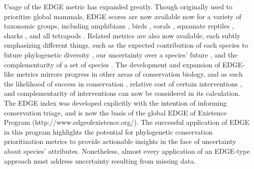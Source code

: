 \documentclass[10pt,english]{article}
\begin{document}
Usage of the EDGE metric has expanded greatly. Though originally used to
prioritize global mammals, EDGE scores are now available now for a variety of
taxonomic groups, including amphibians \autocite{Isaac2012}, birds
\autocite{Jetz2014}, corals \autocite{Curnick2015}, squamate reptiles
\autocite{Tonini2016}, sharks \autocite{Stein2018}, and all tetrapods
\autocite{Gumbs2018}. Related metrics are also now available, each subtly
emphasizing different things, such as the expected contribution of each species
to future phylogenetic diversity \autocite[HEDGE,
I-HEDGE;][]{Steel2007,Jensen2016}, our uncertainty over a species' future
\autocite[EDAM;][]{Pearse2015}, and the complementarity of a set of species
\autocite{Faith2003}. The development and expansion of EDGE-like metrics mirrors
progress in other areas of conservation biology, and as such the likelihood of
success in conservation \autocite{Wilson2007, Mcbride2007}, relative cost of
certain interventions \autocite{Naidoo2006}, and complementarity of
interventions \autocite{Pressey1993, Myers2000} can now be considered in its
calculation. The EDGE index was developed explicitly with the intention of
informing conservation triage, and is now the basis of the global EDGE of
Existence Program (http://www.edgeofexistence.org/). The successful application
of EDGE in this program highlights the potential for phylogenetic conservation
prioritization metrics to provide actionable insights in the face of uncertainty
about species’ attributes. Nonetheless, almost every application of an EDGE-type
approach must address uncertainty resulting from missing data.
\end{document}
